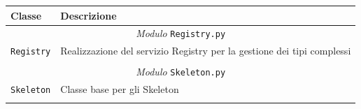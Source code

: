 \begin{longtable}{p{5.5cm}p{6.5cm}}
\hline 
\textbf{Classe} & \textbf{Descrizione} \\ 
\hline\hline 
\endhead

\multicolumn{2}{c}{\emph{Modulo} \texttt{Registry.py}}\\
	\hdashline[5pt/5pt]
		\texttt{Registry} & Realizzazione del servizio Registry per la gestione dei tipi complessi \\ 
	\hline\\

\multicolumn{2}{c}{\emph{Modulo} \texttt{Skeleton.py}}\\
	\hdashline[5pt/5pt]
		\texttt{Skeleton} & Classe base per gli Skeleton \\ 
	\hline\\
	

\end{longtable}
